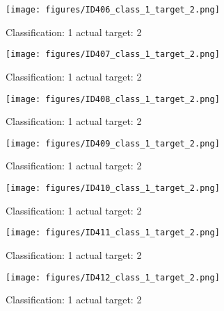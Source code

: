 \begin{figure}[h!]
\begin{center}
\texttt{[image: figures/ID406\_class\_1\_target\_2.png]}
\end{center}
\caption{ Classification: 1 actual target: 2}
\label{fig:ID406_class_1_target_2}
\end{figure}
\begin{figure}[h!]
\begin{center}
\texttt{[image: figures/ID407\_class\_1\_target\_2.png]}
\end{center}
\caption{ Classification: 1 actual target: 2}
\label{fig:ID407_class_1_target_2}
\end{figure}
\begin{figure}[h!]
\begin{center}
\texttt{[image: figures/ID408\_class\_1\_target\_2.png]}
\end{center}
\caption{ Classification: 1 actual target: 2}
\label{fig:ID408_class_1_target_2}
\end{figure}
\begin{figure}[h!]
\begin{center}
\texttt{[image: figures/ID409\_class\_1\_target\_2.png]}
\end{center}
\caption{ Classification: 1 actual target: 2}
\label{fig:ID409_class_1_target_2}
\end{figure}
\begin{figure}[h!]
\begin{center}
\texttt{[image: figures/ID410\_class\_1\_target\_2.png]}
\end{center}
\caption{ Classification: 1 actual target: 2}
\label{fig:ID410_class_1_target_2}
\end{figure}
\begin{figure}[h!]
\begin{center}
\texttt{[image: figures/ID411\_class\_1\_target\_2.png]}
\end{center}
\caption{ Classification: 1 actual target: 2}
\label{fig:ID411_class_1_target_2}
\end{figure}
\begin{figure}[h!]
\begin{center}
\texttt{[image: figures/ID412\_class\_1\_target\_2.png]}
\end{center}
\caption{ Classification: 1 actual target: 2}
\label{fig:ID412_class_1_target_2}
\end{figure}
